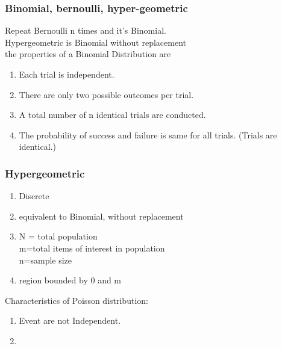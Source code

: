 \documentclass{beamer}
\begin{document}
\begin{frame}\frametitle{Binomial, bernoulli, hyper-geometric}
Repeat Bernoulli n times and it's Binomial.\\
Hypergeometric is Binomial without replacement\\

the properties of a Binomial Distribution are
\begin{enumerate}
\item Each trial is independent.
\item There are only two possible outcomes per trial.
\item A total number of n identical trials are conducted.
\item The probability of success and failure is same for all trials. (Trials are identical.)
\end{enumerate}

\end{frame}


\begin{frame}\frametitle{Hypergeometric}
\begin{enumerate}
\item Discrete
\item equivalent to Binomial, without replacement
\item N = total population\\ m=total items of interest in population\\n=sample size
\item region bounded by 0 and m
\end{enumerate}
Characteristics of Poisson distribution:
\begin{enumerate}
\item Event are not Independent.
\item 
\end{enumerate}	

\end{frame}
\end{document}
